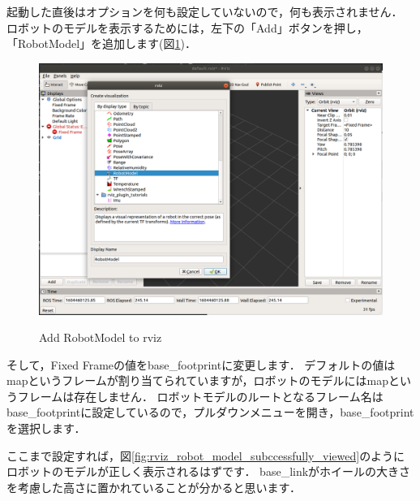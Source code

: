 \documentclass[{../../master}]{subfiles}
\begin{document}
起動した直後はオプションを何も設定していないので，何も表示されません．
ロボットのモデルを表示するためには，左下の「Add」ボタンを押し，「\textsf{RobotModel}」を追加します(図\ref{fig:rviz_add_robot_model})．

\begin{figure}[ht]
  \centering
  \includegraphics[width=100truemm]{images/rviz_add_robot_model.png}
  \label{fig:rviz_add_robot_model}
  \caption{Add \textsf{RobotModel} to \textsf{rviz}}
\end{figure}

\noindent
そして，\textsf{Fixed Frame}の値を\textsf{base\_footprint}に変更します．
デフォルトの値は\textsf{map}というフレームが割り当てられていますが，ロボットのモデルには\textsf{map}というフレームは存在しません．
ロボットモデルのルートとなるフレーム名は\textsf{base\_footprint}に設定しているので，プルダウンメニューを開き，\textsf{base\_footprint}を選択します．

ここまで設定すれば，図\ref{fig:rviz_robot_model_subccessfully_viewed}のようにロボットのモデルが正しく表示されるはずです．
\textsf{base\_link}がホイールの大きさを考慮した高さに置かれていることが分かると思います．
\end{document}
